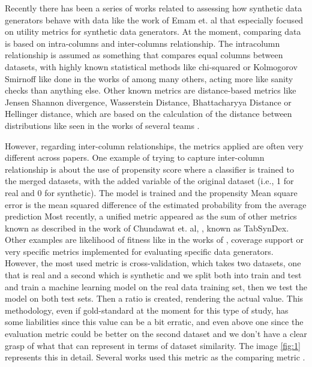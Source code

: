 Recently there has been a series of works related to assessing how synthetic data generators behave with data like the work of Emam et. al \cite{emamUtilityMetricsEvaluating2022} that especially focused on utility metrics for synthetic data generators. At the moment, comparing data is based on intra-columns and inter-columns relationship. The intracolumn relationship is assumed as something that compares equal columns between datasets, with highly known statistical methods like chi-squared or Kolmogorov Smirnoff like done in the works of \cite{combrinkComparingSyntheticTabular2022} among many others, acting more like sanity checks than anything else. 
Other known metrics are distance-based metrics like Jensen Shannon divergence, Wasserstein Distance, Bhattacharyya Distance or Hellinger distance, which are based on the calculation of the distance between distributions like seen in the works of several teams \cite{ISI:000557358500024,choiGeneratingMultilabelDiscrete2017,Baowaly2019}.

However, regarding inter-column relationships, the metrics applied are often very different across papers. One example of trying to capture inter-column relationship is about the use of propensity score \cite{rosenbaumCentralRolePropensity1983,mullerEvaluationSyntheticElectronic2022} where a classifier is trained to the merged datasets, with the added variable of the original dataset (i.e., 1 for real and 0 for synthetic). The model is trained and the propensity Mean square error is the  mean squared difference of the estimated probability from the average prediction
Most recently, a unified metric appeared as the sum of other metrics known as described in the work of Chundawat et. al, \cite{chundawatTabSynDexUniversalMetric2022}, known as TabSynDex. Other examples are likelihood of fitness like in the works of \cite{xuModelingTabularData2019b}, coverage support \cite{goncalvesGenerationEvaluationSynthetic2020a} or very specific metrics implemented for evaluating specific data generators.
However, the most used metric is cross-validation, which takes two datasets, one that is real and a second which is synthetic and we split both into train and test and train a machine learning model on the real data training set, then we test the model on both test sets. Then a ratio is created, rendering the actual value. This methodology, even if gold-standard at the moment for this type of study, has some liabilities since this value can be a bit erratic, and even above one since the evaluation metric could be better on the second dataset and we don't have a clear grasp of what that can represent in terms of dataset similarity. The image \ref{fig:1} represents this in detail. Several works used this metric as the comparing metric \cite{mullerEvaluationSyntheticElectronic2022}.

